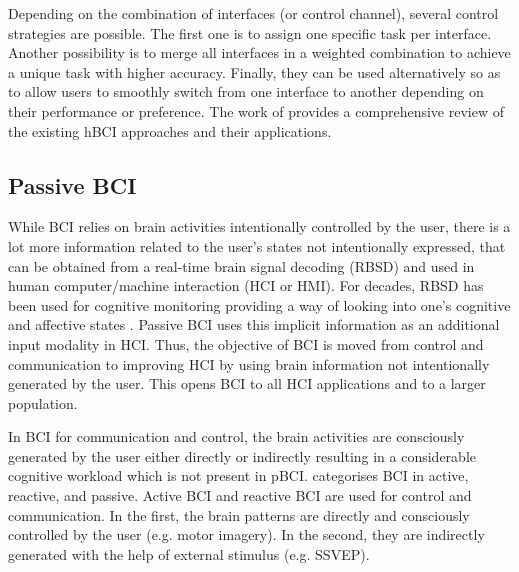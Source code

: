 Depending on the combination of interfaces (or control channel), several control strategies are possible.
The first one is to assign one specific task per interface.
Another possibility is to merge all interfaces in a weighted combination to achieve a unique task with higher accuracy.
Finally, they can be used alternatively so as to allow users to smoothly switch from one interface to another depending on their performance or preference. 
The work of \cite{millan_combining_2010} provides a comprehensive review of the existing hBCI approaches and their applications.
  
\subsection{Passive BCI}

While BCI relies on brain activities intentionally controlled by the user, there is a lot more information related to the user's states not intentionally expressed, that can be obtained from a real-time brain signal decoding (RBSD) and used in human computer/machine interaction (HCI or HMI).
For decades, RBSD has been used for cognitive monitoring providing a way of looking into one's cognitive and affective states \citep{zander_towards_2011}.
Passive BCI uses this implicit information as an additional input modality in HCI.    
Thus, the objective of BCI is moved from control and communication to improving HCI by using brain information not intentionally generated by the user. 
This opens BCI to all HCI applications and to a larger population.

In BCI for communication and control, the brain activities are consciously generated by the user either directly or indirectly resulting in a considerable cognitive workload which is not present in pBCI.
\cite{zander_towards_2011} categorises BCI in active, reactive, and passive. 
Active BCI and reactive BCI are used for control and communication. 
In the first, the brain patterns are directly and consciously controlled by the user (e.g. motor imagery). 
In the second, they are indirectly generated with the help of external stimulus (e.g. SSVEP).

